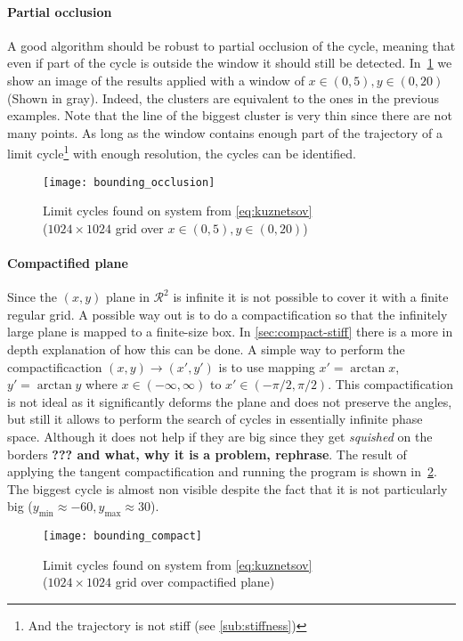 \pagebreak
\paragraph{Partial occlusion}

A good algorithm should be robust to partial occlusion of the cycle, meaning that even if part of the cycle is outside the window it should still be detected. In~\cref{fig:bounding_occ} we show an image of the results applied with a window of $x \in (0, 5), y \in (0, 20)$ (Shown in gray). Indeed, the clusters are equivalent to the ones in the previous examples. Note that the line of the biggest cluster is very thin
since there are not many points. As long as the window contains enough part of the trajectory of a limit cycle\footnote{And the trajectory is not stiff (see \cref{sub:stiffness})} with enough resolution, the cycles can be identified.

\begin{figure}[H]
    \centering
    \texttt{[image: bounding\_occlusion]}
    \caption{Limit cycles found on system from \cref{eq:kuznetsov} \\
        ($1024 \times 1024$ grid over $x \in (0, 5), y \in (0, 20)$)
    }%
    \label{fig:bounding_occ}
\end{figure}

\pagebreak
\paragraph{Compactified plane}

Since the $(x,y)$ plane in $\mathcal{R}^2$ is infinite it is not possible to cover it with a finite regular grid. A possible way out is
to do a compactification so that the infinitely large plane is mapped to a finite-size box. In \cref{sec:compact-stiff} there is a more in depth explanation of how this can be done. A simple way to perform the compactificaction $(x,y)\to(x',y')$ is to use mapping $x' = \arctan x$, $y' = \arctan y$ where $x\in(-\infty, \infty)$ to $x'\in(-\pi/2, \pi/2)$. This compactification is not ideal as it significantly deforms the plane and does not preserve the angles, but still it allows to perform the search of cycles in essentially infinite phase space. Although it does not help if they are big since they get \emph{squished} on the borders
{\bf ??? and what, why it is a problem, rephrase}. The result of applying the tangent compactification and running the program is shown
in~\cref{fig:bounding_compact}. The biggest cycle is almost non visible despite the fact that it is not particularly big ($y_{\min} \approx -60, y_{\max} \approx 30$).

\begin{figure}[H]
    \centering
    \texttt{[image: bounding\_compact]}
    \caption{Limit cycles found on system from \cref{eq:kuznetsov} \\
        ($1024 \times 1024$ grid over compactified plane)
    }%
    \label{fig:bounding_compact}
\end{figure}
